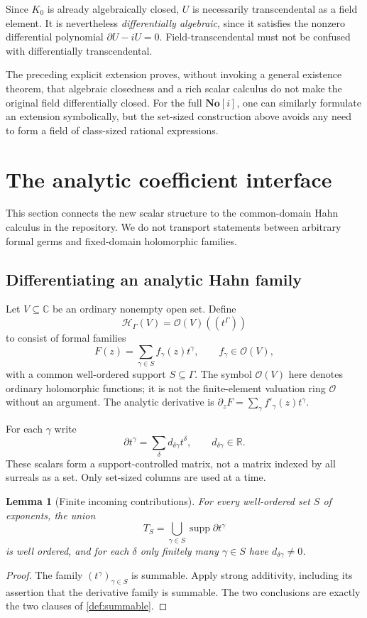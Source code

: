 \documentclass[11pt,a4paper]{article}
\newtheorem{lemma}[theorem]{Lemma}
\theoremstyle{definition}
\newcommand{\SC}{\mathbf{No}[i]}
\newcommand{\R}{\mathbb R}
\newcommand{\C}{\mathbb C}
\newcommand{\D}{\partial}
\newcommand{\OO}{\mathcal O}
\newcommand{\HH}{\mathscr H}
\newcommand{\supp}{\operatorname{supp}}
\numberwithin{equation}{section}
\begin{document}
Since $K_0$ is already algebraically closed, $U$ is necessarily
transcendental as a field element. It is nevertheless
\emph{differentially algebraic}, since it satisfies the nonzero
differential polynomial $\D U-iU=0$. Field-transcendental must not be
confused with differentially transcendental.

The preceding explicit extension proves, without invoking a general
existence theorem, that algebraic closedness and a rich scalar calculus do
not make the original field differentially closed. For the full $\SC$,
one can similarly formulate an extension symbolically, but the set-sized
construction above avoids any need to form a field of class-sized
rational expressions.

\section{The analytic coefficient interface}\label{sec:analytic}

This section connects the new scalar structure to the common-domain
Hahn calculus in the repository. We do not transport statements between
arbitrary formal germs and fixed-domain holomorphic families.

\subsection{Differentiating an analytic Hahn family}
Let $V\subseteq\C$ be an ordinary nonempty open set. Define
\[
 \HH_\Gamma(V)=\OO(V)((t^\Gamma))
\]
to consist of formal families
\begin{equation}\label{eq:analyticfamily}
 F(z)=\sum_{\gamma\in S}f_\gamma(z)t^\gamma,
 \qquad f_\gamma\in\OO(V),
\end{equation}
with a common well-ordered support $S\subseteq\Gamma$.
The symbol $\OO(V)$ here denotes ordinary holomorphic functions; it is
not the finite-element valuation ring $\OO$ without an argument.
The analytic derivative is
$\partial_zF=\sum_\gamma f'_\gamma(z)t^\gamma$.

For each $\gamma$ write
\begin{equation}\label{eq:monomialmatrix}
 \D t^\gamma=\sum_\delta d_{\delta\gamma}t^\delta,
 \qquad d_{\delta\gamma}\in\R.
\end{equation}
These scalars form a support-controlled matrix, not a matrix indexed by
all surreals as a set. Only set-sized columns are used at a time.

\begin{lemma}[Finite incoming contributions]\label{lem:finiteincoming}
For every well-ordered set $S$ of exponents, the union
\[
 T_S=\bigcup_{\gamma\in S}\supp\D t^\gamma
\]
is well ordered, and for each $\delta$ only finitely many
$\gamma\in S$ have $d_{\delta\gamma}\ne0$.
\end{lemma}
\begin{proof}
The family $(t^\gamma)_{\gamma\in S}$ is summable. Apply strong
additivity, including its assertion that the derivative family is
summable. The two conclusions are exactly the two clauses of
\cref{def:summable}.
\end{proof}
\end{document}

